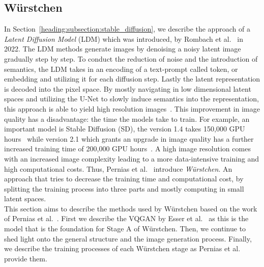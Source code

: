 \subsection{W\"urstchen}
In Section~\ref{heading:subsection:stable_diffusion}, we describe the approach
of a \emph{Latent Diffusion Model} (LDM) which was introduced,
by Rombach et al.~\cite{rombach2022stablediffusion} in 2022. The LDM methods
generate images by denoising a noisy latent image gradually step by step. To
conduct the reduction of noise and the introduction of semantics, the LDM takes
in an encoding of a text-prompt called token, or embedding and utilizing it for
each diffusion step. Lastly the latent representation is decoded into the
pixel space. By mostly navigating in low dimensional latent spaces and
utilizing the U-Net to slowly induce semantics into the representation, this
approach is able to yield high resolution images~\cite{rombach2022stablediffusion}.
This improvement in image quality has a disadvantage: the time the models take
to train. For example, an important model is Stable Diffusion (SD), the version
1.4 takes 150,000 GPU hours~\cite{rombach2022sd_1_4} while version 2.1 which
grants an upgrade in image quality has a further increased training time of
200,000 GPU hours~\cite{rombach2023sd_2_1}. A high image resolution comes with
an increased image complexity leading to a more data-intensive training and
high computational costs. Thus, Pernias et al.~\cite{pernias2024wrstchen}
introduce \emph{W\"urstchen}. An approach that tries to decrease the training
time and computational cost, by splitting the training process into three parts
and mostly computing in small latent spaces.\\

This section aims to describe the methods used by W\"urstchen based on the work
of Pernias et al.~\cite{pernias2024wrstchen}. First we describe the VQGAN by
Esser et al.~\cite{esser2021tamingtransformershighresolutionimage} as this is
the model that is the foundation for Stage A of W\"urstchen. Then, we continue
to shed light onto the general structure and the image generation process. Finally, we
describe the training processes of each W\"urstchen stage as Pernias et al.
provide them.

